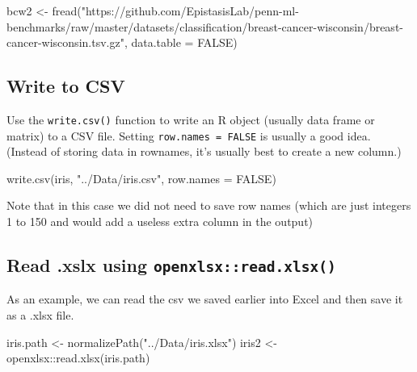 \documentclass[
]{book}
\newenvironment{Shaded}{\begin{snugshade}}{\end{snugshade}}
\newcommand{\AttributeTok}[1]{\textcolor[rgb]{0.77,0.63,0.00}{#1}}
\newcommand{\ConstantTok}[1]{\textcolor[rgb]{0.00,0.00,0.00}{#1}}
\newcommand{\FunctionTok}[1]{\textcolor[rgb]{0.00,0.00,0.00}{#1}}
\newcommand{\NormalTok}[1]{#1}
\newcommand{\OtherTok}[1]{\textcolor[rgb]{0.56,0.35,0.01}{#1}}
\newcommand{\SpecialCharTok}[1]{\textcolor[rgb]{0.00,0.00,0.00}{#1}}
\newcommand{\StringTok}[1]{\textcolor[rgb]{0.31,0.60,0.02}{#1}}
\begin{document}
\begin{Shaded}
\begin{Highlighting}[]
\NormalTok{bcw2 }\OtherTok{\textless{}{-}} \FunctionTok{fread}\NormalTok{(}\StringTok{"https://github.com/EpistasisLab/penn{-}ml{-}benchmarks/raw/master/datasets/classification/breast{-}cancer{-}wisconsin/breast{-}cancer{-}wisconsin.tsv.gz"}\NormalTok{,}
              \AttributeTok{data.table =} \ConstantTok{FALSE}\NormalTok{)}
\end{Highlighting}
\end{Shaded}

\hypertarget{write-to-csv}{%
\subsection{Write to CSV}\label{write-to-csv}}

Use the \texttt{write.csv()} function to write an R object (usually data frame or matrix) to a CSV file. Setting \texttt{row.names\ =\ FALSE} is usually a good idea. (Instead of storing data in rownames, it's usually best to create a new column.)

\begin{Shaded}
\begin{Highlighting}[]
\FunctionTok{write.csv}\NormalTok{(iris, }\StringTok{"../Data/iris.csv"}\NormalTok{, }\AttributeTok{row.names =} \ConstantTok{FALSE}\NormalTok{)}
\end{Highlighting}
\end{Shaded}

Note that in this case we did not need to save row names (which are just integers 1 to 150 and would add a useless extra column in the output)

\hypertarget{read-.xslx-using-openxlsxread.xlsx}{%
\subsection{\texorpdfstring{Read .xslx using \texttt{openxlsx::read.xlsx()}}{Read .xslx using openxlsx::read.xlsx()}}\label{read-.xslx-using-openxlsxread.xlsx}}

As an example, we can read the csv we saved earlier into Excel and then save it as a .xlsx file.

\begin{Shaded}
\begin{Highlighting}[]
\NormalTok{iris.path }\OtherTok{\textless{}{-}} \FunctionTok{normalizePath}\NormalTok{(}\StringTok{"../Data/iris.xlsx"}\NormalTok{)}
\NormalTok{iris2 }\OtherTok{\textless{}{-}}\NormalTok{ openxlsx}\SpecialCharTok{::}\FunctionTok{read.xlsx}\NormalTok{(iris.path)}
\end{Highlighting}
\end{Shaded}
\end{document}
